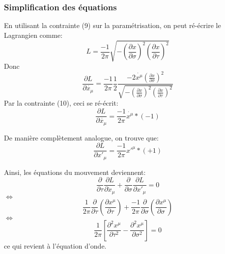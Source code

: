 \documentclass[a4paper,12pt]{article}
\begin{document}
\subsubsection{Simplification des équations}
En utilisant la contrainte (9) sur la paramétrisation, on peut ré-écrire le Lagrangien comme:
$$L=\frac{-1}{2\pi}\sqrt{ -\left( \frac{\partial x}{\partial \sigma}\right) ^{2}\left( \frac{\partial x}{\partial \tau}\right) ^{2} }$$
Donc 
$$\frac{\partial L}{\partial \dot{x_{\mu}}}=\frac{-1}{2\pi}\frac{1}{2}\frac{-2\dot{x^{\mu}}\left( \frac{\partial x}{\partial \sigma}\right) ^{2}}{\sqrt{ -\left( \frac{\partial x}{\partial \sigma}\right) ^{2}\left( \frac{\partial x}{\partial \tau}\right) ^{2} }}$$
Par la contrainte (10), ceci se ré-écrit:
$$\frac{\partial L}{\partial \dot{x_{\mu}}}=\frac{-1}{2\pi}\dot{x^\mu}*(-1)$$

De manière complètement analogue, on trouve que:
$$\frac{\partial L}{\partial x'_{\mu}}=\frac{-1}{2\pi}x'^\mu*(+1)$$

Ainsi, les équations du mouvement deviennent:
$$\frac{\partial}{\partial \tau}\frac{\partial L}{\partial \dot x_{\mu}}+\frac{\partial}{\partial \sigma}\frac{\partial L}{\partial  x'_{\mu}}=0$$
$\Leftrightarrow$
$$\frac{1}{2\pi}\frac{\partial}{\partial \tau}\left( \frac{\partial x^\mu}{\partial \tau}\right)+\frac{-1}{2\pi}\frac{\partial}{\partial \sigma}\left( \frac{\partial x^\mu}{\partial \sigma}\right) $$
$\Leftrightarrow$
$$\frac{1}{2\pi}\left[ \frac{\partial^2 x^\mu}{\partial \tau^2}-\frac{\partial^2 x^\mu}{\partial \sigma^2}\right] =0$$
ce qui revient à l'équation d'onde.
\end{document}
